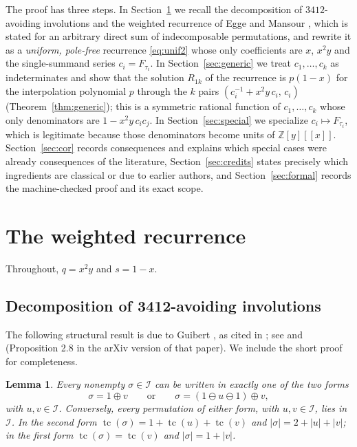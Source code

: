 \documentclass[11pt]{amsart}
\newtheorem{lemma}[theorem]{Lemma}
\theoremstyle{definition}
\DeclareMathOperator{\tc}{tc}
\newcommand{\I}{\mathcal{I}}
\newcommand{\Z}{\mathbb{Z}}
\newcommand{\ds}{\oplus}
\newcommand{\sk}{\ominus}
\begin{document}
The proof has three steps. In Section~\ref{sec:rec} we recall the decomposition of $3412$-avoiding involutions and the weighted recurrence of Egge and Mansour \cite[Theorem 3.3]{EggeMansour2006}, which is stated for an arbitrary direct sum of indecomposable permutations, and rewrite it as a \emph{uniform, pole-free} recurrence \eqref{eq:unif2} whose only coefficients are $x$, $x^2y$ and the single-summand series $c_i=F_{\tau_i}$. In Section~\ref{sec:generic} we treat $c_1,\dots,c_k$ as indeterminates and show that the solution $R_{1k}$ of the recurrence is $p(1-x)$ for the interpolation polynomial $p$ through the $k$ pairs $(c_i^{-1}+x^2y\,c_i,\,c_i)$ (Theorem~\ref{thm:generic}); this is a symmetric rational function of $c_1,\dots,c_k$ whose only denominators are $1-x^2y\,c_ic_j$. In Section~\ref{sec:special} we specialize $c_i\mapsto F_{\tau_i}$, which is legitimate because those denominators become units of $\Z[y][[x]]$. Section~\ref{sec:cor} records consequences and explains which special cases were already consequences of the literature, Section~\ref{sec:credits} states precisely which ingredients are classical or due to earlier authors, and Section~\ref{sec:formal} records the machine-checked proof and its exact scope.

\section{The weighted recurrence}\label{sec:rec}

Throughout, $q=x^2y$ and $s=1-x$.

\subsection{Decomposition of 3412-avoiding involutions}
The following structural result is due to Guibert \cite[Remark 4.28]{Guibert1995}, as cited in \cite[\S2]{EggeMansour2006}; see \cite[Proposition 2.1]{EggeMansour2006} and \cite[Proposition 2.9]{Egge2004} (Proposition 2.8 in the arXiv version of that paper). We include the short proof for completeness.

\begin{lemma}\label{lem:decomp}
Every nonempty $\sigma\in\I$ can be written in exactly one of the two forms
\[
\sigma=1\ds v\qquad\text{or}\qquad \sigma=(1\sk u\sk1)\ds v,
\]
with $u,v\in\I$. Conversely, every permutation of either form, with $u,v\in\I$, lies in $\I$. In the second form $\tc(\sigma)=1+\tc(u)+\tc(v)$ and $|\sigma|=2+|u|+|v|$; in the first form $\tc(\sigma)=\tc(v)$ and $|\sigma|=1+|v|$.
\end{lemma}
\end{document}
